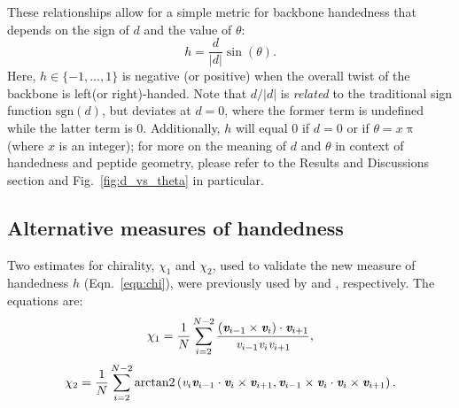 \documentclass[fleqn,10pt,lineno]{wlpeerj} %
\newcommand{\n}[1]{{\color{black}#1}} %
\newcommand{\Fig}[1]{Fig.~\ref{#1}}
\newcommand{\Eqn}[1]{Eqn.~\ref{#1}}
\newcommand{\h}{h}
\begin{document}
These relationships allow for a simple metric for backbone handedness that depends on the sign of $d$ and the value of $\theta$:
\n{
\begin{equation}\label{eqn:chi}
\h = \frac{d}{\lvert d \rvert} \sin(\theta).
\end{equation}
Here, $\h \in \{-1,\ldots,1\}$ is negative (or positive) when the overall twist of the backbone is left(or right)-handed. Note that $d/\lvert d \rvert$ is {\em related} to the traditional sign function $\textrm{sgn}(d)$, but deviates at $d=0$, where the former term is undefined while the latter term is 0. Additionally, $\h$ will equal 0 if $d=0$ or if $\theta=x\uppi$ (where $x$ is an integer); for more on the meaning of $d$ and $\theta$ in context of handedness and peptide geometry, please refer to the Results and Discussions section and \Fig{fig:d_vs_theta} in particular.} 

\subsection*{Alternative measures of handedness} 

Two estimates for chirality, $\chi_1$ and $\chi_2$, used to validate the new measure of handedness $\h$ (\Eqn{eqn:chi}), were previously used by \cite{Kwiecinska2005} and \cite{Kabsch1983}, respectively. The equations are: 
\begin{equation} \label{eqn:chi1}
\chi_1 = \frac{1}{N}\sum_{i = 2}^{N-2} \frac{(\textit{\textbf{v}}_{i-1} \times \textit{\textbf{v}}_{i})\cdot \textit{\textbf{v}}_{i+1}}{\textit{v}_{i-1} \textit{v}_{i} \textit{v}_{i+1}},
\end{equation}
\begin{equation}\label{eqn:chi2}
\displaystyle \chi_2 = \frac{1}{N}\sum_{i = 2}^{N-2}
 \textrm{arctan2}\left (\textit{v}_i \textit{\textbf{v}}_{i-1} \cdot \textit{\textbf{v}}_i \times \textit{\textbf{v}}_{i+1},\textit{\textbf{v}}_{i-1}\times \textit{\textbf{v}}_i \cdot \textit{\textbf{v}}_i\times \textit{\textbf{v}}_{i+1} \right ).
\end{equation}
\end{document}
